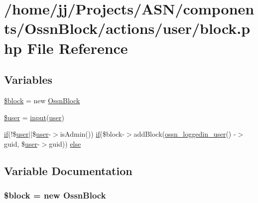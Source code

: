 \hypertarget{block_8php}{}\section{/home/jj/\+Projects/\+A\+S\+N/components/\+Ossn\+Block/actions/user/block.php File Reference}
\label{block_8php}
\subsection*{Variables}
\begin{DoxyCompactItemize}
\item 
\hyperlink{block_8php_a7f8f86b37cd48a37bf0df573d8512d11}{\$block} = new \hyperlink{class_ossn_block}{Ossn\+Block}
\item 
\hyperlink{block_8php_a598ca4e71b15a1313ec95f0df1027ca5}{\$user} = \hyperlink{ossn_8lib_8input_8php_a64ebee98b041c4f75f71ed3cd73cc8ed}{input}(\textquotesingle{}\hyperlink{ossn_8config_8db_8example_8php_a802544b7ba9f79bbf24ef67773d53bed}{user}\textquotesingle{})
\item 
\hyperlink{jquery_8tokeninput_8js_ad8dd46a3cbc004569e34401e9e71771a}{if}(!\$\hyperlink{ossn_8config_8db_8example_8php_a802544b7ba9f79bbf24ef67773d53bed}{user}$\vert$$\vert$\$\hyperlink{ossn_8config_8db_8example_8php_a802544b7ba9f79bbf24ef67773d53bed}{user}-\/$>$is\+Admin()) \hyperlink{jquery_8tokeninput_8js_ad8dd46a3cbc004569e34401e9e71771a}{if}(\$block-\/$>$add\+Block(\hyperlink{ossn_8lib_8users_8php_aa3c8068d0e6638b414d6a2f6c62565b8}{ossn\+\_\+loggedin\+\_\+user}() -\/$>$guid, \$\hyperlink{ossn_8config_8db_8example_8php_a802544b7ba9f79bbf24ef67773d53bed}{user}-\/$>$guid)) \hyperlink{block_8php_abcb3f137f17f392258406cd4c74c4da1}{else}
\end{DoxyCompactItemize}


\subsection{Variable Documentation}
\subsubsection[{\texorpdfstring{\$block}{$block}}]{\setlength{\rightskip}{0pt plus 5cm}\$block = new {\bf Ossn\+Block}}\hypertarget{block_8php_a7f8f86b37cd48a37bf0df573d8512d11}{}\label{block_8php_a7f8f86b37cd48a37bf0df573d8512d11}


